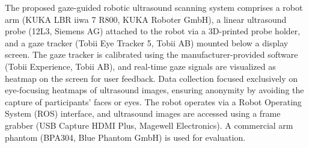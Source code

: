 \par
The proposed gaze-guided robotic ultrasound scanning system comprises a robot arm (KUKA LBR iiwa 7 R800, KUKA Roboter GmbH), a linear ultrasound probe (12L3, Siemens AG) attached to the robot via a 3D-printed probe holder, and a gaze tracker (Tobii Eye Tracker 5, Tobii AB) mounted below a display screen. The gaze tracker is calibrated using the manufacturer-provided software (Tobii Experience, Tobii AB), and real-time gaze signals are visualized as heatmap on the screen for user feedback. Data collection focused exclusively on eye-focusing heatmaps of ultrasound images, ensuring anonymity by avoiding the capture of participants' faces or eyes. 
The robot operates via a Robot Operating System (ROS) interface, and ultrasound images are accessed using a frame grabber (USB Capture HDMI Plus, Magewell Electronics). A commercial arm phantom (BPA304, Blue Phantom GmbH) is used for evaluation.

